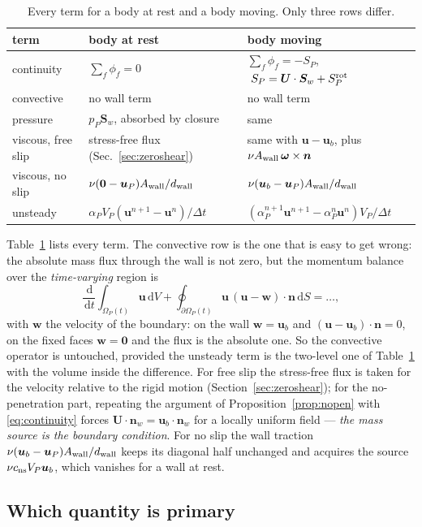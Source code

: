 \documentclass[11pt,a4paper]{article}
\theoremstyle{remark}
\newcommand{\uu}{\bm{u}}
\newcommand{\ub}{\uu_b}
\newcommand{\nn}{\bm{n}}
\newcommand{\Sw}{\bm{S}_w}
\newcommand{\dd}{\,\mathrm{d}}
\newcommand{\dt}{\Delta t}
\newcommand{\Aw}{A_{\rm wall}}
\newcommand{\dw}{d_{\rm wall}}
\newcommand{\cns}{c_{\rm ns}}
\begin{document}
\begin{table}[htbp]\centering\small
\caption{Every term for a body at rest and a body moving. Only three rows differ.}
\label{tab:moving}
\begin{tabular}{@{}lll@{}}
\toprule
term & body at rest & body moving\\
\midrule
continuity & $\sum_f\phi_f=0$ & $\sum_f\phi_f=-S_P$, $\;S_P=\bm U\cdot\Sw+S^{\rm rot}_P$\\
convective & no wall term & no wall term\\
pressure & $p_P\Sw$, absorbed by closure & same\\
viscous, free slip & stress-free flux (Sec.~\ref{sec:zeroshear}) & same with $\uu-\ub$, plus $\nu\Aw\,\bm\omega\times\nn$\\
viscous, no slip & $\nu(\bm 0-\uu_P)\Aw/\dw$ & $\nu(\ub-\uu_P)\Aw/\dw$\\
unsteady & $\alpha_PV_P(\uu^{n+1}-\uu^n)/\dt$ & $(\alpha^{n+1}_P\uu^{n+1}-\alpha^n_P\uu^n)V_P/\dt$\\
\bottomrule
\end{tabular}
\end{table}

Table~\ref{tab:moving} lists every term. The convective row is the one that is easy to get
wrong: the absolute mass flux through the wall is not zero, but the momentum balance over the
\emph{time-varying} region is
\begin{equation}
\frac{\dd}{\dd t}\int_{\Omega_P(t)}\uu\dd V+\oint_{\partial\Omega_P(t)}\uu\,(\uu-\bm w)\cdot\nn\dd S
=\dots,
\end{equation}
with $\bm w$ the velocity of the boundary: on the wall $\bm w=\ub$ and $(\uu-\ub)\cdot\nn=0$, on
the fixed faces $\bm w=\bm 0$ and the flux is the absolute one. So the convective operator is
untouched, provided the unsteady term is the two-level one of Table~\ref{tab:moving} with the
volume inside the difference. For free slip the stress-free flux is taken for the velocity relative
to the rigid motion (Section~\ref{sec:zeroshear}); for the no-penetration part, repeating the argument of
Proposition~\ref{prop:nopen} with \eqref{eq:continuity} forces $\bm U\cdot\nn_w=\ub\cdot\nn_w$
for a locally uniform field --- \emph{the mass source is the boundary condition}. For no slip
the wall traction $\nu(\ub-\uu_P)\Aw/\dw$ keeps its diagonal half unchanged and acquires the
source $\nu\cns V_P\ub$, which vanishes for a wall at rest.

\subsection{Which quantity is primary}
\label{sec:primary}
\end{document}
